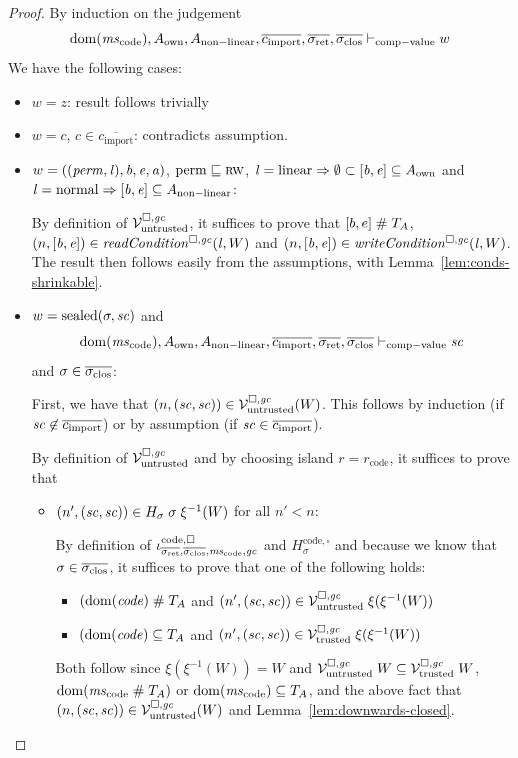 \documentclass[a4paper]{article}
\begin{document}
\begin{proof}
  By induction on the judgement 
  \begin{equation*}
    \dom(\mscode), A_{\mathrm{own}}, A_{\mathrm{non-linear}}, \overline{c_{\mathrm{import}}}, \sigrets,\sigcloss \vdash_{\mathrm{comp-value}} w
  \end{equation*}
  We have the following cases:
  \begin{itemize}
  \item $w = z$: result follows trivially
  \item $w = c$, $c \in \overline{c_{\mathrm{import}}}$: contradicts assumption.
  \item $w = ((\perm,\lin),\baddr,\eaddr,\aaddr)$,
    $\permbnf \sqsubseteq \rw$,
    $\lin = \linear \Rightarrow \emptyset \subset [\baddr,\eaddr] \subseteq A_{\mathrm{own}}$ and
    $\lin = \normal \Rightarrow [\baddr,\eaddr] \subseteq A_{\mathrm{non-linear}}$:
    
    By definition of $\lrv$, it suffices to prove that $[b,e] \mathrel{\#} \ta$, $\npair{[\baddr,\eaddr]} \in \readCond{\lin,W}$ and $\npair{[\baddr,\eaddr]}\in\writeCond{\lin,W}$.
    The result then follows easily from the assumptions, with Lemma~\ref{lem:conds-shrinkable}.
    
  \item $w = \sealed{\sigma,\vsc}$ and
    \begin{equation*}
      \dom(\mscode),A_{\mathrm{own}},A_{\mathrm{non-linear}},\overline{c_{\mathrm{import}}},\sigrets,\sigcloss \vdash_{\mathrm{comp-value}} \vsc
    \end{equation*}
    and $\sigma \in \sigcloss$:

    First, we have that $\npair{(\vsc,\vsc)} \in \lrv (W)$.
    This follows by induction (if $\vsc \not\in \overline{c_{\mathrm{import}}}$) or by assumption (if $\vsc \in \overline{c_{\mathrm{import}}}$).

    By definition of $\lrv$ and by choosing island $r = r_{\mathrm{code}}$, it suffices to prove that
    \begin{itemize}
    \item $\npair[n']{(\vsc,\vsc)} \in H_\sigma \; \sigma \; \xi^{-1}(W)$ for all $n' < n$:

     By definition of $\codereg{\sigrets,\sigcloss,\mscode,\gc}$ and $H^\mathrm{code,\square}_\sigma$ and because we know that $\sigma\in\sigcloss$, it suffices to prove that
     one of the following holds: 
     \begin{itemize}
     \item $(\dom(\code) \mathrel{\#} \ta$ and $\npair[n']{(\vsc,\vsc)} \in \lrv \; \xi(\xi^{-1}(W))$
     \item $(\dom(\code) \subseteq \ta$ and $\npair[n']{(\vsc,\vsc)} \in \lrvtrusted \; \xi(\xi^{-1}(W))$
     \end{itemize}
     Both follow since $\xi(\xi^{-1}(W)) = W$ and $\lrv \; W \subseteq \lrvtrusted \; W$, $\dom(\mscode \mathrel{\#} \ta)$ or $\dom(\mscode) \subseteq \ta$, and the above fact that $\npair{(\vsc,\vsc)} \in \lrv (W)$ and Lemma~\ref{lem:downwards-closed}.


\end{itemize}
\end{itemize}
\end{proof}
\end{document}
